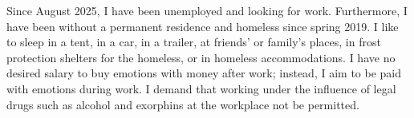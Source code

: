 \versionLanguageStart%
		Since August 2025, I have been unemployed and looking for work.
		Furthermore, I have been without a permanent residence and homeless since spring 2019.
		I like to sleep in a tent, in a car, in a trailer, at friends' or family's places, in frost protection shelters for the homeless, or in homeless accommodations.
		I have no desired salary to buy emotions with money after work; instead, I aim to be paid with emotions during work.
		I demand that working under the influence of legal drugs such as alcohol and exorphins at the workplace not be permitted.
\versionLanguageEnd